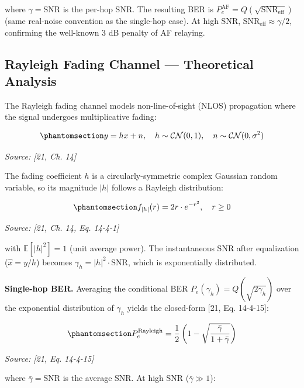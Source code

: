 where \(\gamma = \text{SNR}\) is the per-hop SNR. The resulting BER is \(P_e^{\text{AF}} = Q\left(\sqrt{\text{SNR}_{\text{eff}}}\right)\) (same real-noise convention as the single-hop case). At high SNR, \(\text{SNR}_{\text{eff}} \approx \gamma/2\), confirming the well-known 3 dB penalty of AF relaying.


\subsection{Rayleigh Fading Channel --- Theoretical Analysis}\label{sec:rayleigh-fading-channel-theoretical-analysis}

The Rayleigh fading channel models non-line-of-sight (NLOS) propagation where the signal undergoes multiplicative fading:

\begin{equation}\protect\phantomsection\label{eq:rayleigh-channel}{y = hx + n, \quad h \sim \mathcal{CN}(0, 1), \quad n \sim \mathcal{CN}(0, \sigma^2)
}\end{equation} \par{\small\textit{Source: [21, Ch. 14]}}

The fading coefficient \(h\) is a circularly-symmetric complex Gaussian random variable, so its magnitude \(|h|\) follows a Rayleigh distribution:

\begin{equation}\protect\phantomsection\label{eq:rayleigh-pdf}{f_{|h|}(r) = 2r \cdot e^{-r^2}, \quad r \geq 0
}\end{equation} \par{\small\textit{Source: [21, Ch. 14, Eq. 14-4-1]}}

with \(\mathbb{E}[|h|^2] = 1\) (unit average power). The instantaneous SNR after equalization (\(\hat{x} = y/h\)) becomes \(\gamma_h = |h|^2 \cdot \text{SNR}\), which is exponentially distributed.

\textbf{Single-hop BER.} Averaging the conditional BER \(P_e(\gamma_h) = Q(\sqrt{2\gamma_h})\) over the exponential distribution of \(\gamma_h\) yields the closed-form {[}21, Eq. 14-4-15{]}:

\begin{equation}\protect\phantomsection\label{eq:rayleigh-ber}{P_e^{\text{Rayleigh}} = \frac{1}{2}\left(1 - \sqrt{\frac{\bar{\gamma}}{1 + \bar{\gamma}}}\right)
}\end{equation} \par{\small\textit{Source: [21, Eq. 14-4-15]}}

where \(\bar{\gamma} = \text{SNR}\) is the average SNR. At high SNR (\(\bar{\gamma} \gg 1\)):

